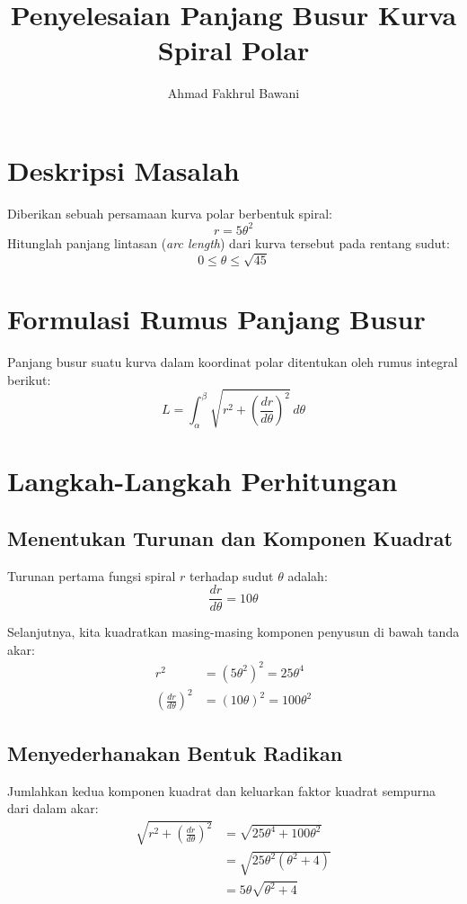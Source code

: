 \documentclass[11pt,a4paper]{article}
\title{\textbf{Penyelesaian Panjang Busur Kurva Spiral Polar}}
\author{Ahmad Fakhrul Bawani}
\date{}
\begin{document}
\maketitle

\section{Deskripsi Masalah}
Diberikan sebuah persamaan kurva polar berbentuk spiral:
\begin{equation}
  r = 5\theta^2
\end{equation}
Hitunglah panjang lintasan (\textit{arc length}) dari kurva tersebut pada rentang sudut:
\begin{equation*}
  0 \le \theta \le \sqrt{45}
\end{equation*}

\section{Formulasi Rumus Panjang Busur}
Panjang busur suatu kurva dalam koordinat polar ditentukan oleh rumus integral berikut:
\begin{equation}
  L = \int_{\alpha}^{\beta} \sqrt{r^2 + \left(\frac{dr}{d\theta}\right)^2} \, d\theta
\end{equation}

\section{Langkah-Langkah Perhitungan}

\subsection{Menentukan Turunan dan Komponen Kuadrat}
Turunan pertama fungsi spiral $r$ terhadap sudut $\theta$ adalah:
\begin{equation*}
  \frac{dr}{d\theta} = 10\theta
\end{equation*}

Selanjutnya, kita kuadratkan masing-masing komponen penyusun di bawah tanda akar:
\begin{align*}
  r^2 &= (5\theta^2)^2 = 25\theta^4 \\
  \left(\frac{dr}{d\theta}\right)^2 &= (10\theta)^2 = 100\theta^2
\end{align*}

\subsection{Menyederhanakan Bentuk Radikan}
Jumlahkan kedua komponen kuadrat dan keluarkan faktor kuadrat sempurna dari dalam akar:
\begin{align*}
  \sqrt{r^2 + \left(\frac{dr}{d\theta}\right)^2} &= \sqrt{25\theta^4 + 100\theta^2} \\
  &= \sqrt{25\theta^2(\theta^2 + 4)} \\
  &= 5\theta\sqrt{\theta^2 + 4}
\end{align*}
\end{document}
